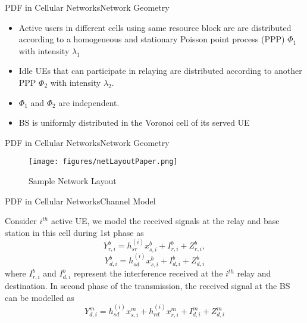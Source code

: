\documentclass{beamer}
\begin{document}
\begin{frame}{PDF in Cellular Networks}{Network Geometry}

\begin{itemize}
\item Active users in different cells using same resource block are are distributed according to a homogeneous and stationary Poisson point process (PPP) $\Phi_1$ with intensity $\lambda_1$
\item Idle UEs that can participate in relaying are distributed according to another PPP $\Phi_2$ with intensity $\lambda_2$.
\item $\Phi_1$ and $\Phi_2$ are independent.
\item BS is uniformly distributed in the Voronoi cell of its served UE
\end{itemize}
\end{frame}

\begin{frame}{PDF in Cellular Networks}{Network Geometry}
\begin{figure}
\centering
\texttt{[image: figures/netLayoutPaper.png]}
  \caption{Sample Network Layout}
\end{figure}
\end{frame}

\begin{frame}{PDF in Cellular Networks}{Channel Model}

Consider $i^{th}$ active UE, we model the received signals at the relay and base station in this cell during 1st phase as
\begin{equation*}
Y_{r,i}^b = h^{(i)}_{sr}x_{s,i}^b + I_{r,i}^b + Z_{r,i}^b,
\end{equation*}
\begin{equation*}
Y_{d,i}^b = h^{(i)}_{sd}x_{s,i}^b + I_{d,i}^b + Z_{d,i}^b
\end{equation*}
where $I_{r,i}^b$ and $I_{d,i}^b$ represent the interference received at the $i^{th}$ relay and destination. 
In second phase of the transmission, the received signal at the BS can be modelled as 
\begin{equation*}
Y_{d,i}^m = h^{(i)}_{sd}x_{s,i}^m + h^{(i)}_{rd}x_{r,i}^m+ I_{d,i}^m + Z_{d,i}^m
\end{equation*}
\end{frame}
\end{document}
